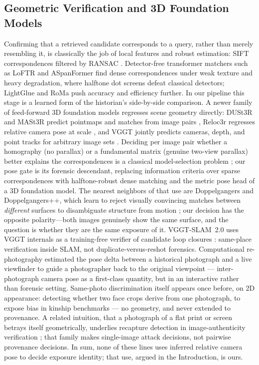 \documentclass[letterpaper]{article} %
\begin{document}
\subsection{Geometric Verification and 3D Foundation Models}
Confirming that a retrieved candidate corresponds to a query, rather than
merely resembling it, is classically the job of local features and robust
estimation: SIFT correspondences filtered by RANSAC
\cite{lowe2004sift,fischler1981ransac}. Detector-free transformer matchers
such as LoFTR \cite{sun2021loftr} and ASpanFormer \cite{chen2022aspanformer}
find dense correspondences under weak texture and heavy degradation, where
halftone dot screens defeat classical detectors; LightGlue
\cite{lindenberger2023lightglue} and RoMa
\cite{edstedt2024roma,edstedt2025romav2} push accuracy and efficiency further.
In our pipeline this stage is a learned form of the historian's side-by-side
comparison. A newer family of feed-forward 3D foundation models regresses
scene geometry directly: DUSt3R and MASt3R predict pointmaps and matches from
image pairs \cite{wang2024dust3r,leroy2024mast3r}, Reloc3r regresses relative
camera pose at scale \cite{dong2025reloc3r}, and VGGT jointly predicts
cameras, depth, and point tracks for arbitrary image sets \cite{wang2025vggt}.
Deciding per image pair whether a homography (no parallax) or a fundamental
matrix (genuine two-view parallax) better explains the correspondences is a
classical model-selection problem \cite{torr1998gric}; our pose gate is its
forensic descendant, replacing information criteria over sparse
correspondences with halftone-robust dense matching and the metric pose head
of a 3D foundation model. The nearest neighbors of that use are Doppelgangers
and Doppelgangers++, which learn to reject visually convincing matches between
\emph{different} surfaces to disambiguate structure from motion
\cite{cai2023doppelgangers,xiangli2025doppelgangerspp}; our decision has the
opposite polarity---both images genuinely show the same surface, and the
question is whether they are the same exposure of it. VGGT-SLAM~2.0 uses VGGT
internals as a training-free verifier of candidate loop closures
\cite{maggio2026vggtslam}: same-place verification inside SLAM, not
duplicate-versus-reshot forensics. Computational re-photography estimated the
pose delta between a historical photograph and a live viewfinder to guide a
photographer back to the original viewpoint \cite{bae2010rephotography}---
inter-photograph camera pose as a first-class quantity, but in an interactive
rather than forensic setting. Same-photo discrimination itself appears once
before, on 2D appearance: detecting whether two face crops derive from one
photograph, to expose bias in kinship benchmarks \cite{dawson2018samephoto}---
no geometry, and never extended to provenance. A related intuition, that a
photograph of a flat print or screen betrays itself geometrically, underlies
recapture detection in image-authenticity verification
\cite{vilesov2024deepfakes}; that family makes single-image attack decisions,
not pairwise provenance decisions. In sum, none of these lines uses inferred
relative camera pose to decide exposure identity; that use, argued in the
Introduction, is ours.
\end{document}
